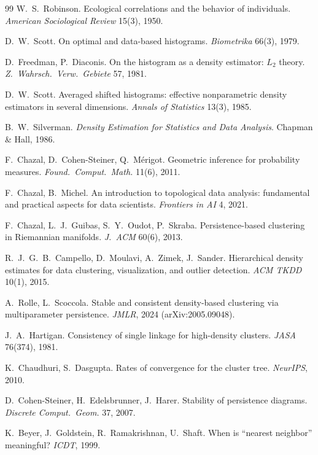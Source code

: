 \documentclass[11pt,letterpaper]{article}
\begin{document}
\begin{thebibliography}{99}
 W.~S.~Robinson. Ecological correlations and the
behavior of individuals. \emph{American Sociological Review} 15(3), 1950.

 D.~W.~Scott. On optimal and data-based histograms.
\emph{Biometrika} 66(3), 1979.

 D.~Freedman, P.~Diaconis. On the histogram as a
density estimator: $L_2$ theory. \emph{Z.\ Wahrsch.\ Verw.\ Gebiete} 57,
1981.

 D.~W.~Scott. Averaged shifted histograms: effective
nonparametric density estimators in several dimensions. \emph{Annals of
Statistics} 13(3), 1985.

 B.~W.~Silverman. \emph{Density Estimation for
Statistics and Data Analysis}. Chapman \& Hall, 1986.

 F.~Chazal, D.~Cohen-Steiner, Q.~M\'erigot. Geometric
inference for probability measures. \emph{Found.\ Comput.\ Math.} 11(6),
2011.

 F.~Chazal, B.~Michel. An introduction to
topological data analysis: fundamental and practical aspects for data
scientists. \emph{Frontiers in AI} 4, 2021.

 F.~Chazal, L.~J.~Guibas, S.~Y.~Oudot, P.~Skraba.
Persistence-based clustering in Riemannian manifolds. \emph{J.\ ACM} 60(6),
2013.

 R.~J.~G.~B.~Campello, D.~Moulavi, A.~Zimek,
J.~Sander. Hierarchical density estimates for data clustering,
visualization, and outlier detection. \emph{ACM TKDD} 10(1), 2015.

 A.~Rolle, L.~Scoccola. Stable and consistent
density-based clustering via multiparameter persistence. \emph{JMLR}, 2024
(arXiv:2005.09048).

 J.~A.~Hartigan. Consistency of single linkage for
high-density clusters. \emph{JASA} 76(374), 1981.

 K.~Chaudhuri, S.~Dasgupta. Rates of convergence for
the cluster tree. \emph{NeurIPS}, 2010.

 D.~Cohen-Steiner, H.~Edelsbrunner, J.~Harer.
Stability of persistence diagrams. \emph{Discrete Comput.\ Geom.} 37, 2007.

 K.~Beyer, J.~Goldstein, R.~Ramakrishnan, U.~Shaft. When
is ``nearest neighbor'' meaningful? \emph{ICDT}, 1999.


\end{thebibliography}
\end{document}
